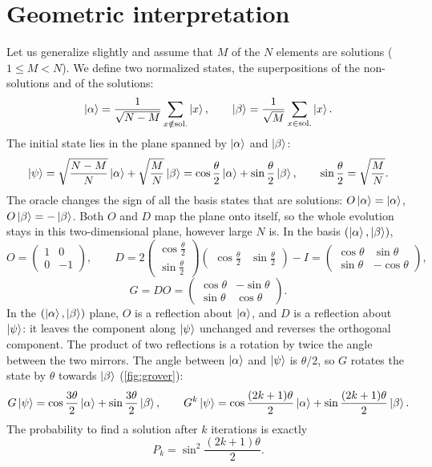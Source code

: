 \section{Geometric interpretation}
Let us generalize slightly and assume that $M$ of the $N$ elements are solutions ($1\le M<N$). We define two normalized states, the superpositions of the non-solutions and of the solutions:
\begin{equation}
  \left|\alpha\right\rangle=\frac1{\sqrt{N-M}}\sum_{x\notin\text{sol.}}\left|x\right\rangle,\qquad\left|\beta\right\rangle=\frac1{\sqrt M}\sum_{x\in\text{sol.}}\left|x\right\rangle.
\end{equation}
The initial state lies in the plane spanned by $\left|\alpha\right\rangle$ and $\left|\beta\right\rangle$:
\begin{equation}
  \left|\psi\right\rangle=\sqrt{\frac{N-M}N}\left|\alpha\right\rangle+\sqrt{\frac MN}\left|\beta\right\rangle=\cos\frac\theta2\left|\alpha\right\rangle+\sin\frac\theta2\left|\beta\right\rangle,\qquad\sin\frac\theta2=\sqrt{\frac MN}.
\end{equation}
The oracle changes the sign of all the basis states that are solutions: $O\left|\alpha\right\rangle=\left|\alpha\right\rangle$, $O\left|\beta\right\rangle=-\left|\beta\right\rangle$. Both $O$ and $D$ map the plane onto itself, so the whole evolution stays in
this two-dimensional plane, however large $N$ is. In the basis $(\left|\alpha\right\rangle,\left|\beta\right\rangle)$,
\begin{equation}
  O=\begin{pmatrix}1&0\\0&-1\end{pmatrix},\qquad
  D=2\begin{pmatrix}\cos\frac\theta2\\ \sin\frac\theta2\end{pmatrix}\begin{pmatrix}\cos\frac\theta2&\sin\frac\theta2\end{pmatrix}-I=\begin{pmatrix}\cos\theta&\sin\theta\\ \sin\theta&-\cos\theta\end{pmatrix},
\end{equation}
\begin{equation}
  G=DO=\begin{pmatrix}\cos\theta&-\sin\theta\\ \sin\theta&\cos\theta\end{pmatrix}.
\end{equation}
In the $(\left|\alpha\right\rangle,\left|\beta\right\rangle)$ plane, $O$ is a reflection about $\left|\alpha\right\rangle$, and $D$ is a reflection about $\left|\psi\right\rangle$: it leaves the component along $\left|\psi\right\rangle$ unchanged and reverses the orthogonal component.
The product of two reflections is a rotation by twice the angle between the two mirrors. The angle between $\left|\alpha\right\rangle$ and $\left|\psi\right\rangle$ is $\theta/2$, so $G$ rotates the state by $\theta$ towards $\left|\beta\right\rangle$ (\cref{fig:grover}):
\begin{equation}
  G\left|\psi\right\rangle=\cos\frac{3\theta}2\left|\alpha\right\rangle+\sin\frac{3\theta}2\left|\beta\right\rangle,\qquad
  G^k\left|\psi\right\rangle=\cos\frac{(2k+1)\theta}2\left|\alpha\right\rangle+\sin\frac{(2k+1)\theta}2\left|\beta\right\rangle.
\end{equation}
The probability to find a solution after $k$ iterations is exactly
\begin{equation}\label{eq:groverprob}
  P_k=\sin^2\frac{(2k+1)\theta}2.
\end{equation}

